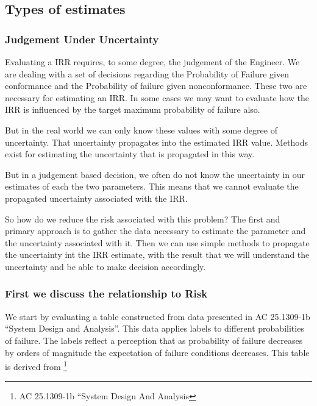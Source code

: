 \documentclass[
]{article}
\begin{document}
\subsection{Types of estimates}\label{types-of-estimates}

\subsubsection{Judgement Under Uncertainty}\label{judgement-under-uncertainty}

Evaluating a IRR requires, to some degree, the judgement of the Engineer. We are dealing with a set of decisions regarding the Probability of Failure given conformance and the Probability of failure given nonconformance. These two are necessary for estimating an IRR. In some cases we may want to evaluate how the IRR is influenced by the target maximum probability of failure also.

But in the real world we can only know these values with some degree of uncertainty. That uncertainty propagates into the estimated IRR value. Methods exist for estimating the uncertainty that is propagated in this way.

But in a judgement based decision, we often do not know the uncertainty in our estimates of each the two parameters. This means that we cannot evaluate the propagated uncertainty associated with the IRR.

So how do we reduce the risk associated with this problem? The first and primary approach is to gather the data necessary to estimate the parameter and the uncertainty associated with it. Then we can use simple methods to propagate the uncertainty int the IRR estimate, with the result that we will understand the uncertainty and be able to make decision accordingly.

\subsubsection{First we discuss the relationship to Risk}\label{first-we-discuss-the-relationship-to-risk}

We start by evaluating a table constructed from data presented in AC 25.1309-1b ``System Design and Analysis''. This data applies labels to different probabilities of failure. The labels reflect a perception that as probability of failure decreases by orders of magnitude the expectation of failure conditions decreases. This table is derived from \footnote{AC 25.1309-1b ``System Design And Analysis}
\end{document}
